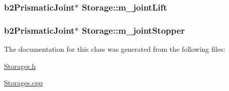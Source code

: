 \hypertarget{classStorage_a989c2bbe46e9874a4f4fed780a3d5de6}{
\subsubsection[{m\-\_\-joint\-Lift}]{\setlength{\rightskip}{0pt plus 5cm}b2\-Prismatic\-Joint$\ast$ Storage\-::m\-\_\-joint\-Lift}}\label{classStorage_a989c2bbe46e9874a4f4fed780a3d5de6}
\hypertarget{classStorage_ae96e6bf24e9d9c9788129bb6d87d10ab}{
\subsubsection[{m\-\_\-joint\-Stopper}]{\setlength{\rightskip}{0pt plus 5cm}b2\-Prismatic\-Joint$\ast$ Storage\-::m\-\_\-joint\-Stopper}}\label{classStorage_ae96e6bf24e9d9c9788129bb6d87d10ab}


The documentation for this class was generated from the following files\-:\begin{DoxyCompactItemize}
\item 
\hyperlink{Storages_8h}{Storages.\-h}\item 
\hyperlink{Storages_8cpp}{Storages.\-cpp}\end{DoxyCompactItemize}
